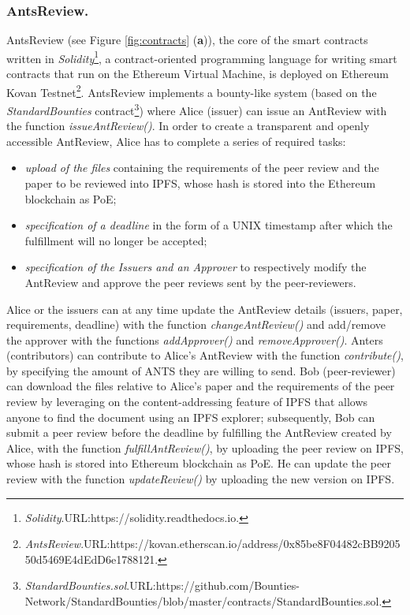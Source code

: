 \documentclass[runningheads]{llncs}
\begin{document}
\subsubsection{AntsReview.}
AntsReview (see Figure \ref{fig:contracts} (\textbf{a})), the core of the smart contracts written in \emph{Solidity}\footnote[7]{\emph{Solidity}.\textsc{URL:}https://solidity.readthedocs.io.}, a contract-oriented programming language for writing smart contracts that run on the Ethereum Virtual Machine, is deployed on Ethereum Kovan Testnet\footnote[8]{\emph{AntsReview}.\textsc{URL:}\newline https://kovan.etherscan.io/address/0x85be8F04482cBB920550d5469E4dEdD6e1788121.}. AntsReview implements a bounty-like system (based on the \emph{StandardBounties} contract\footnote[9]{\emph{StandardBounties.sol}.\textsc{URL:}https://github.com/Bounties-Network/StandardBounties/blob/master/contracts/StandardBounties.sol.}) where Alice (issuer) can issue an AntReview with the function \emph{issueAntReview()}.
\newline In order to create a transparent and openly accessible AntReview, Alice has to complete a series of required tasks:
 \begin{itemize}
     \item \emph{upload of the files} containing the requirements of the peer review and the paper to be reviewed into IPFS, whose hash is stored into the Ethereum blockchain as PoE;
     \item \emph{specification of a deadline} in the form of a UNIX timestamp after which the fulfillment will no longer be accepted;
     \item \emph{specification of the Issuers and an Approver} to respectively modify the AntReview and approve the peer reviews sent by the peer-reviewers.
\end{itemize}
Alice or the issuers can at any time update the AntReview details (issuers, paper, requirements, deadline) with the function \emph{changeAntReview()} and add/remove the approver with the functions \emph{addApprover()} and \emph{removeApprover()}.
 Anters (contributors) can contribute to Alice's AntReview with the function \emph{contribute()}, by specifying the amount of ANTS they are willing to send. 
Bob (peer-reviewer) can download the files relative to Alice's paper and the requirements of the peer review by leveraging on the content-addressing feature of IPFS that allows anyone to find the document using an IPFS explorer; subsequently, Bob can submit a peer review before the deadline by fulfilling the AntReview created by Alice, with the function \emph{fulfillAntReview()}, by uploading the peer review on IPFS, whose hash is stored into Ethereum blockchain as PoE. He can update the peer review with the function \emph{updateReview()} by uploading the new version on IPFS. 
\end{document}

